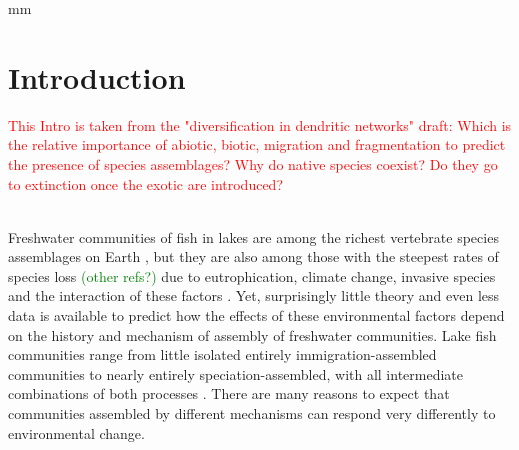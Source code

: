 \documentclass[12pt]{article}
\newcommand{\carlos}[1]{\textcolor{Red}{#1}}
\newcommand{\greg}[1]{\textcolor{Green}{#1}}
\begin{document}
  
  


\date{}

\maketitle
{} mm
\linenumbers
\modulolinenumbers[2]

\newpage
\begin{abstract} 
.
\end{abstract}

\newpage {\fontsize{12}{22}} \selectfont

 \section{Introduction}

    \carlos{This Intro is taken from the "diversification in dendritic networks" draft: Which is the relative importance of abiotic, biotic, migration and fragmentation to predict the presence of species assemblages? Why do native species coexist? Do they go to extinction once the exotic are introduced?}

    \\
    
  Freshwater communities of fish in lakes are among the richest
  vertebrate species assemblages on Earth \citep{Leveque_Global_2007, Vadeboncoeur_Borders_2011}, but they are also among those with the steepest rates of species loss \citep{Vonlanthen_Eutrophication_2012,Seehausen_Cichlid_1997}
\greg{(other refs?)} due to eutrophication, climate change, invasive species
  and the interaction of these factors \citep{vorosmarty_global_2010}. Yet,
  surprisingly little theory and even less data is available to
  predict how the effects of these environmental factors depend on the
  history and mechanism of assembly of freshwater communities. Lake
  fish communities range from little isolated entirely
  immigration-assembled communities to nearly entirely
  speciation-assembled, with all intermediate combinations of both
  processes \citep{Wagner_Cichlid_2014}. There are many reasons to expect
  that communities assembled by different mechanisms can respond very
  differently to environmental change.
\end{document}
